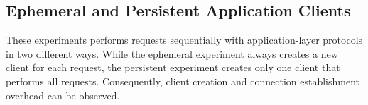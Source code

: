\subsection{Ephemeral and Persistent Application Clients}

These experiments performs requests sequentially with application-layer protocols in two different ways. While the ephemeral experiment always creates a new client for each request, the persistent experiment creates only one client that performs all requests. Consequently, client creation and connection establishment overhead can be observed.


\clearpage


\clearpage


\clearpage
